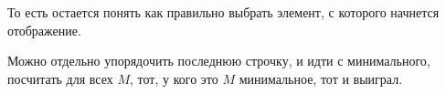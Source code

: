 \documentclass[12pt]{article}
\begin{document}
\begin{enumerate}
    То есть остается понять как правильно выбрать элемент,
    с которого начнется отображение.

    Можно отдельно упорядочить последнюю строчку,
    и идти с минимального, посчитать для всех $M$,
    тот, у кого это $M$ минимальное, тот и выиграл.

    \end{enumerate}
\end{document}
